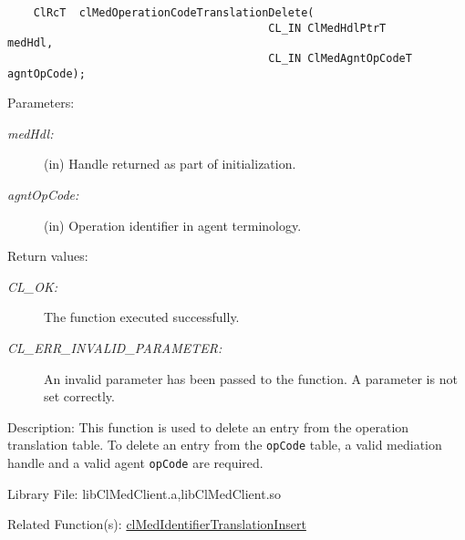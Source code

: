 \begin{flushleft}
\begin{Desc}
\footnotesize\begin{verbatim}    ClRcT  clMedOperationCodeTranslationDelete(
                                   		CL_IN ClMedHdlPtrT         medHdl,
                                   		CL_IN ClMedAgntOpCodeT  agntOpCode);
\end{verbatim}
\normalsize
\end{Desc}
\begin{Desc}
\item[Parameters:]
\begin{description}
\item[{\em med\-Hdl:}](in) Handle returned as part of initialization. 
\item[{\em agnt\-Op\-Code:}](in) Operation identifier in agent terminology.\end{description}
\end{Desc}
\begin{Desc}
\item[Return values:]
\begin{description}
\item[{\em CL\_\-OK:}]The function executed successfully. 
\item[{\em CL\_\-ERR\_\-INVALID\_\-PARAMETER:}]An invalid parameter has been passed to the function. A parameter is not set correctly.\end{description}
\end{Desc}
\begin{Desc}
\item[Description:]This function is used to delete an entry from the operation translation table. To delete an entry from the {\tt{op\-Code}} table, a valid 
mediation handle and a valid agent {\tt{op\-Code}} are required.\end{Desc}
\begin{Desc}
\item[Library File:]lib\-Cl\-Med\-Client.a,lib\-Cl\-Med\-Client.so\end{Desc}
\begin{Desc}
\item[Related Function(s):]\hyperlink{pagemed104}{cl\-Med\-Identifier\-Translation\-Insert} \end{Desc}
\newpage



\end{flushleft}
